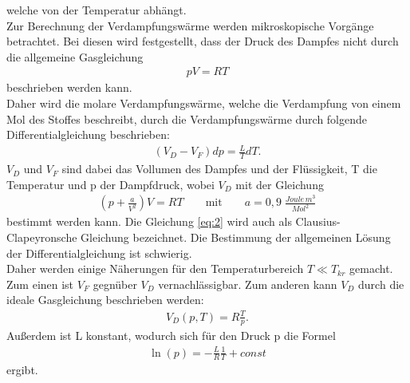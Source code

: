 welche von der Temperatur abhängt.\\
Zur Berechnung der Verdampfungswärme werden mikroskopische Vorgänge betrachtet. Bei diesen
wird festgestellt, dass der Druck des Dampfes nicht durch die allgemeine Gasgleichung
\begin{align}
    pV=RT \label{eq:1}
\end{align}
beschrieben werden kann. \\
Daher wird die molare Verdampfungswärme, welche die Verdampfung von einem Mol des Stoffes
beschreibt, durch die Verdampfungswärme durch folgende Differentialgleichung beschrieben:
\begin{align}
    \left(V_D - V_F\right)dp=\frac{L}{T}dT \label{eq:2}.
\end{align}
$V_D$ und $V_F$ sind dabei das Vollumen des Dampfes und der Flüssigkeit, T die Temperatur und p der Dampfdruck,
wobei $V_D$ mit der Gleichung
\begin{align}
    \left(p+\frac{a}{V^2}\right)V=RT \qquad \text{mit} \qquad a=0,9 \;\frac{Joule\,m^3}{Mol^2} 
\end{align}
bestimmt werden kann.
Die Gleichung \eqref{eq:2} wird auch als Clausius-Clapeyronsche Gleichung bezeichnet.
Die Bestimmung der allgemeinen Lösung der Differentialgleichung ist schwierig. \\
Daher werden einige Näherungen für den Temperaturbereich $T \ll T_{kr}$ gemacht.
Zum einen ist $V_F$ gegnüber $V_D$ vernachlässigbar.
Zum anderen kann $V_D$ durch die ideale Gasgleichung beschrieben werden:
\begin{align}
    V_D(p,T)=R \frac{T}{p} \label{eq:3}.
\end{align}
Außerdem ist L konstant, wodurch sich für den Druck p die Formel
\begin{align}
    \ln(p)=- \frac{L}{R}\frac{1}{T}+const \label{eq:4}
\end{align}
ergibt.


